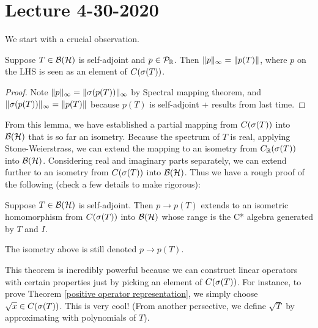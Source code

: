 \section{Lecture 4-30-2020}
We start with a crucial observation.
\begin{lem}
    Suppose $T \in {\mathcal B}({\mathcal H})$ is self-adjoint and $p \in {\mathcal P}_{\mathbb R}$. Then $\|p\|_\infty = \|p(T)\|$, where $p$ on the LHS is seen as an element of $C(\sigma(T))$.
\end{lem}
\begin{proof}
    Note $\|p\|_\infty = \|\sigma(p(T))\|_\infty$ by Spectral mapping theorem, and $\|\sigma(p(T))\|_\infty = \|p(T)\|$ because $p(T)$ is self-adjoint + results from last time.
\end{proof}
From this lemma, we have established a partial mapping from $C(\sigma(T))$ into ${\mathcal B}({\mathcal H})$ that is so far an isometry. Because the spectrum of $T$ is real, applying Stone-Weierstrass, we can extend the mapping to an isometry from $C_{\mathbb R}(\sigma(T))$ into ${\mathcal B}({\mathcal H})$. Considering real and imaginary parts separately, we can extend further to an isometry from $C(\sigma(T))$ into ${\mathcal B}({\mathcal H})$. Thus we have a rough proof of the following (check a few details to make rigorous):
\begin{thm}
    Suppose $T \in {\mathcal B}({\mathcal H})$ is self-adjoint. Then $p \rightarrow p(T)$ extends to an isometric homomorphism from $C(\sigma(T))$ into ${\mathcal B}({\mathcal H})$ whose range is the C* algebra generated by $T$ and $I$.
\end{thm}
\begin{remark}
    The isometry above is still denoted $p \rightarrow p(T)$.
\end{remark}

This theorem is incredibly powerful because we can construct linear operators with certain properties just by picking an element of $C(\sigma(T))$. For instance, to prove Theorem \ref{positive operator representation}, we simply choose $\sqrt{x} \in C(\sigma(T))$. This is very cool! (From another persective, we define $\sqrt{T}$ by approximating with polynomials of $T$).
